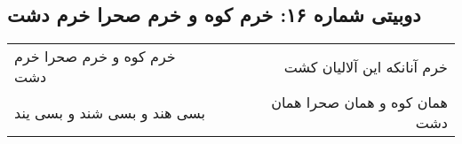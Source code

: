 \begin{center}
\section*{دوبیتی شماره ۱۶: خرم کوه و خرم صحرا خرم دشت}
\label{sec:016}
\begin{longtable}{l p{0.5cm} r}
خرم کوه و خرم صحرا خرم دشت
&&
خرم آنانکه این آلالیان کشت
\\
بسی هند و بسی شند و بسی یند
&&
همان کوه و همان صحرا همان دشت
\\
\end{longtable}
\end{center}
